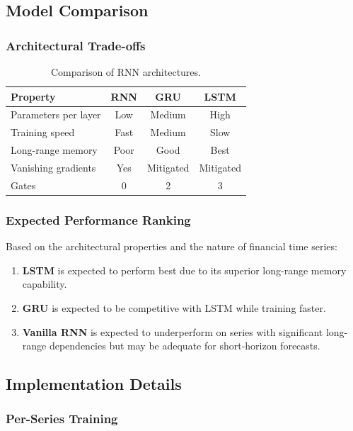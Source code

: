 \subsection{Model Comparison}

\subsubsection{Architectural Trade-offs}

\begin{table}[H]
\centering
\caption{Comparison of RNN architectures.}
\begin{tabular}{lccc}
\toprule
\textbf{Property} & \textbf{RNN} & \textbf{GRU} & \textbf{LSTM} \\
\midrule
Parameters per layer & Low & Medium & High \\
Training speed & Fast & Medium & Slow \\
Long-range memory & Poor & Good & Best \\
Vanishing gradients & Yes & Mitigated & Mitigated \\
Gates & 0 & 2 & 3 \\
\bottomrule
\end{tabular}
\end{table}

\subsubsection{Expected Performance Ranking}

Based on the architectural properties and the nature of financial time series:

\begin{enumerate}
    \item \textbf{LSTM} is expected to perform best due to its superior long-range memory capability.
    \item \textbf{GRU} is expected to be competitive with LSTM while training faster.
    \item \textbf{Vanilla RNN} is expected to underperform on series with significant long-range dependencies but may be adequate for short-horizon forecasts.
\end{enumerate}

\subsection{Implementation Details}

\subsubsection{Per-Series Training}


